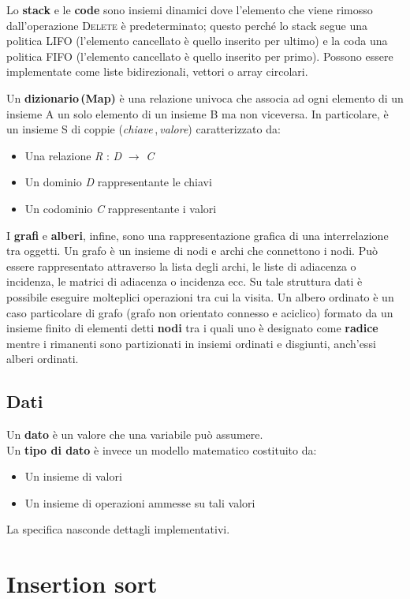 \documentclass[10pt, a4paper]{report}
\begin{document}
Lo \textbf{stack} e le \textbf{code} sono insiemi dinamici dove l'elemento che viene rimosso dall'operazione \textsc{Delete} è predeterminato; questo perché lo stack segue una politica LIFO (l'elemento cancellato è quello inserito per ultimo) e la coda una politica FIFO (l'elemento cancellato è quello inserito per primo). Possono essere implementate come liste bidirezionali, vettori o array circolari.

Un \textbf{dizionario\,(Map)} è una relazione univoca che associa ad ogni elemento di un insieme A un solo elemento di un insieme B ma non viceversa. In particolare, è un insieme S di coppie (\textit{chiave}\,,\,\textit{valore}) caratterizzato da:
\begin{itemize}
\item Una relazione \textit{R} : \textit{D} $\rightarrow$ \textit{C}
\item  Un dominio \textit{D} rappresentante le chiavi
\item Un codominio \textit{C} rappresentante i valori
\end{itemize}

I \textbf{grafi} e \textbf{alberi}, infine, sono una rappresentazione grafica di una interrelazione tra oggetti. Un grafo è un insieme di nodi e archi che connettono i nodi. Può essere rappresentato attraverso la lista degli archi, le liste di adiacenza o incidenza, le matrici di adiacenza o incidenza ecc. Su tale struttura dati è possibile eseguire molteplici operazioni tra cui la visita. Un albero ordinato è un caso particolare di grafo (grafo non orientato connesso e aciclico) formato da un insieme finito di elementi detti \textbf{nodi} tra i quali uno è designato come \textbf{radice} mentre i rimanenti sono partizionati in insiemi ordinati e disgiunti, anch'essi alberi ordinati.
\section{Dati}
Un \textbf{dato} è un valore che una variabile può assumere.\\Un \textbf{tipo di dato} è invece un modello matematico costituito da:
\begin{itemize}
\item Un insieme di valori
\item Un insieme di operazioni ammesse su tali valori
\end{itemize}
La specifica nasconde dettagli implementativi.
\chapter{Insertion sort}
\end{document}
